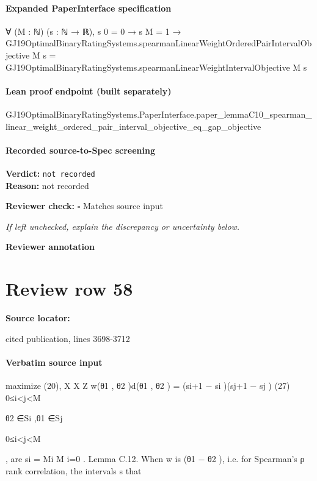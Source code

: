 \documentclass[10pt]{article}
\newcommand{\reviewerbox}{%
  \par\noindent\fbox{\parbox{0.96\linewidth}{\rule{0pt}{0.38in}}}\par
}
\newcommand{\reviewmatch}[1]{%
  \par\noindent\textbf{Reviewer check:} $\square$\; #1\par
  \noindent\emph{If left unchecked, explain the discrepancy or uncertainty below.}\par
}
\begin{document}
\paragraph{Expanded PaperInterface specification}
\begin{ReviewVerbatim}
∀ (M : ℕ) (s : ℕ → ℝ),
  s 0 = 0 →
    s M = 1 →
      GJ19OptimalBinaryRatingSystems.spearmanLinearWeightOrderedPairIntervalObjective M s =
        GJ19OptimalBinaryRatingSystems.spearmanLinearWeightIntervalObjective M s
\end{ReviewVerbatim}

\paragraph{Lean proof endpoint (built separately)}\begin{ReviewVerbatim}
GJ19OptimalBinaryRatingSystems.PaperInterface.paper_lemmaC10_spearman_linear_weight_ordered_pair_interval_objective_eq_gap_objective
\end{ReviewVerbatim}

\paragraph{Recorded source-to-Spec screening}
\textbf{Verdict:} \texttt{not recorded}
\\
\textbf{Reason:} not recorded
\reviewmatch{Matches source input}
\noindent\textbf{Reviewer annotation}\par
\reviewerbox
\clearpage
\hypertarget{source-claim-75f334c9ed5f4c67}{}
\section*{Review row 58}
\textbf{Source locator:} {\footnotesize\raggedright cited publication, lines 3698-\allowbreak{}3712\par}
\paragraph{Verbatim source input}
\begin{ReviewVerbatim}
maximize (20),
X
X Z
w(θ1 , θ2 )d(θ1 , θ2 ) =
(si+1 − si )(sj+1 − sj )
(27)
0≤i<j<M

θ2 ∈Si ,θ1 ∈Sj

0≤i<j<M

, are {si = Mi }M
i=0 .
Lemma C.12. When w is (θ1 − θ2 ), i.e. for Spearman’s ρ rank correlation, the intervals s that
\end{ReviewVerbatim}
\end{document}

